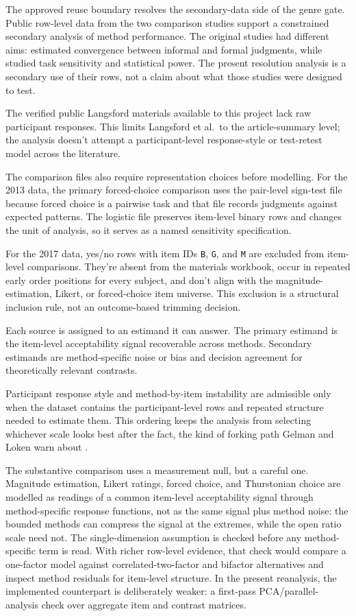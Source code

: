 The approved reuse boundary resolves the secondary-data side of the genre gate.
Public row-level data from the two comparison studies support a constrained
secondary analysis of method performance. The original studies had different
aims: \textcite{sprouse2013} estimated convergence between informal and formal
judgments, while \textcite{sprouse2017} studied task sensitivity and statistical
power. The present resolution analysis is a secondary use of their rows, not a
claim about what those studies were designed to test.

The verified public Langsford materials available to this project lack raw
participant responses. This limits Langsford et al.\ to the article-summary
level; the analysis doesn't attempt a participant-level
response-style or test-retest model across the literature.

The comparison files also require representation choices before modelling. For
the 2013 data, the primary forced-choice comparison uses the pair-level sign-test
file because forced choice is a pairwise task and that file records judgments
against expected patterns. The logistic file preserves item-level binary rows
and changes the unit of analysis, so it serves as a named sensitivity
specification.

For the 2017 data, yes/no rows with item IDs \texttt{B}, \texttt{G}, and
\texttt{M} are excluded from item-level comparisons.
They're absent from the materials workbook, occur in repeated early order
positions for every subject, and don't align with the magnitude-estimation,
Likert, or forced-choice item universe. This exclusion is a structural
inclusion rule, not an outcome-based trimming decision.

Each source is assigned to an estimand it can answer. The primary estimand is
the item-level acceptability signal
recoverable across methods. Secondary estimands are method-specific noise or
bias and decision agreement for theoretically relevant contrasts.

Participant response style and method-by-item instability are admissible only
when the dataset contains the participant-level rows and repeated structure
needed to estimate them. This ordering keeps the analysis from selecting
whichever scale looks best after the fact, the kind of forking path Gelman and
Loken warn about \citep{GelmanLoken2013,gelman2014statcrisis}.

The substantive comparison uses a measurement null, but a careful one. Magnitude
estimation, Likert ratings, forced choice, and Thurstonian choice are modelled
as readings of a common item-level acceptability signal through method-specific
response functions, not as the same signal plus method noise: the bounded
methods can compress the signal at the extremes, while the open ratio scale need
not. The single-dimension assumption is checked before any
method-specific term is read. With richer row-level evidence, that check would
compare a one-factor model against correlated-two-factor and bifactor
alternatives and inspect method residuals for item-level structure. In the
present reanalysis, the implemented counterpart is deliberately weaker:
a first-pass PCA/parallel-analysis check over aggregate item and contrast
matrices.

